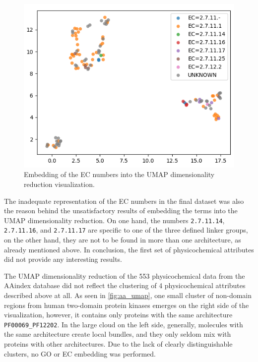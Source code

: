 		\begin{figure}
			\centering
			\includegraphics[width=0.8\linewidth]{img/linker_umap_ec.png}
			\caption{Embedding of the EC numbers into the UMAP dimensionality reduction
			visualization.}
			\label{fig:umap_ec}
		\end{figure}

		The inadequate representation of the EC numbers in the final dataset was also the
		reason behind the unsatisfactory results of embedding the terms into the UMAP
		dimensionality reduction.
		On one hand, the numbers \texttt{2.7.11.14}, \texttt{2.7.11.16}, and
		\texttt{2.7.11.17} are specific to one of the three defined linker groups, on the
		other hand, they are not to be found in more than one architecture, as already
		mentioned above.
		In conclusion, the first set of physicochemical attributes did not provide any
		interesting results.

\label{res:second}

	The UMAP dimensionality reduction of the 553 physicochemical data from the AAindex
	database did not reflect the clustering of 4 physicochemical attributes described above
	at all.
	As seen in \cref{fig:aa_umap}, one small cluster of non-domain regions from human
	two-domain protein kinases emerges on the right side of the visualization, however,
	it contains only proteins with the same architecture \texttt{PF00069\_PF12202}.
	In the large cloud on the left side, generally, molecules with the same architecture
	create local bundles, and they only seldom mix with proteins with other
	architectures.
	Due to the lack of clearly distinguishable clusters, no GO or EC embedding was
	performed.

